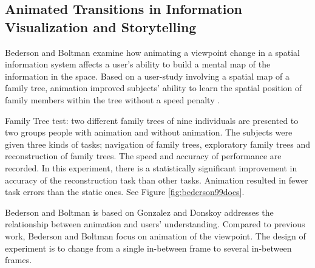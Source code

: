 \documentclass{egpubl}
\begin{document}
\subsection{Animated Transitions in Information Visualization and Storytelling}
Bederson and Boltman examine how animating a viewpoint change in a spatial information system affects a user's ability to build a mental map of the information in the space. Based on a user-study involving a spatial map of a family tree, animation improved subjects' ability to learn the spatial position of family members within the tree without a speed penalty \cite{bedrson}.

Family Tree test: two different family trees of nine individuals are presented to two groups people with animation and without animation. The subjects were given three kinds of tasks; navigation of family trees, exploratory family trees and reconstruction of family trees. The speed and accuracy of performance are recorded. In this experiment, there is a statistically significant improvement in accuracy of the reconstruction task than other tasks. Animation resulted in fewer task errors than the static ones. See Figure \ref{fig:bederson99does}.

Bederson and Boltman is based on Gonzalez \cite{gonzalez} and Donskoy \cite{donskoy} addresses the relationship between animation and users' understanding. Compared to previous work, Bederson and Boltman focus on animation of the viewpoint. The design of experiment is to change from a single in-between frame to several in-between frames.
\end{document}
